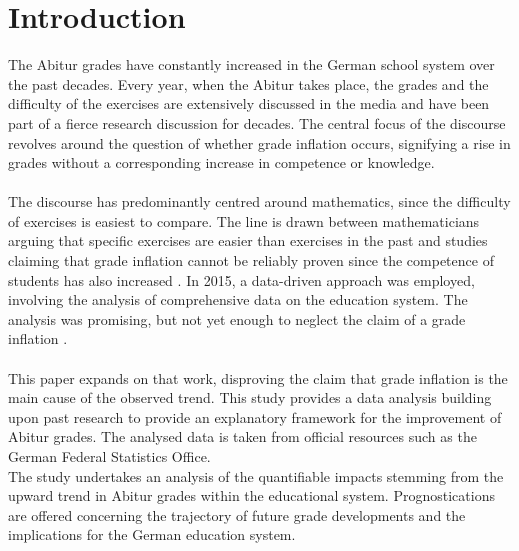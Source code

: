 \section{Introduction}
The Abitur grades have constantly increased in the German school system over the past decades. Every year, when the Abitur takes place, the grades and the difficulty of the exercises are extensively discussed in the media and have been part of a fierce research discussion for decades. The central focus of the discourse revolves around the question of whether grade inflation occurs, signifying a rise in grades without a corresponding increase in competence or knowledge. \\\\
The discourse has predominantly centred around mathematics, since the difficulty of exercises is easiest to compare. The line is drawn between mathematicians arguing that specific exercises are easier than exercises in the past \cite{kuhnel2015modellierungskompetenz} \cite{JahnkeKleinKühnelSonarSpindler+2014+115+122} \cite{lemmermeyer2019zentralabitur} and studies claiming that grade inflation cannot be reliably proven since the competence of students has also increased \cite{Schleithoff+2015+3+26}.
In 2015, a data-driven approach was employed, involving the analysis of comprehensive data on the education system. The analysis was promising, but not yet enough to neglect the claim of a grade inflation \cite{doi:10.7788/bue-2015-0407}. \\\\
This paper expands on that work, disproving the claim that grade inflation is the main cause of the observed trend. This study provides a data analysis building upon past research to provide an explanatory framework for the improvement of Abitur grades. The analysed data is taken from official resources such as the German Federal Statistics Office. \\
The study undertakes an analysis of the quantifiable impacts stemming from the upward trend in Abitur grades within the educational system. Prognostications are offered concerning the trajectory of future grade developments and the implications for the German education system.
